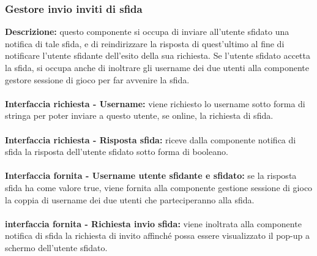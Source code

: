 \subsubsection{Gestore invio inviti di sfida}
\textbf{Descrizione: }questo componente si occupa di inviare all'utente sfidato una notifica di tale sfida, e di reindirizzare la risposta di quest'ultimo al fine di notificare l'utente sfidante dell'esito della sua richiesta. Se l'utente sfidato accetta la sfida, si occupa anche di inoltrare gli username dei due utenti alla componente gestore sessione di gioco per far avvenire la sfida.\\
\\
\textbf{Interfaccia richiesta - Username: }viene richiesto lo username sotto forma di stringa per poter inviare a questo utente, se online, la richiesta di sfida.\\
\\
\textbf{Interfaccia richiesta - Risposta sfida: }riceve dalla componente notifica di sfida la risposta dell'utente sfidato sotto forma di booleano.\\
\\
\textbf{Interfaccia fornita - Username utente sfidante e sfidato: }se la risposta sfida ha come valore true, viene fornita alla componente gestione sessione di gioco la coppia di username dei due utenti che parteciperanno alla sfida.\\
\\
\textbf{interfaccia fornita - Richiesta invio sfida: }viene inoltrata alla componente notifica di sfida la richiesta di invito affinché possa essere visualizzato il pop-up a schermo dell'utente sfidato.\\

